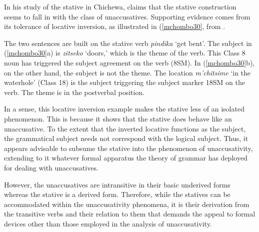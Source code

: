 \documentclass[output=paper]{langscibook}
\begin{document}
In his study of the stative in Chichewa, \citet{Mchombo:1993aa} claims that the stative construction seems to fall in with the class of unaccusatives. Supporting evidence comes from its tolerance of locative inversion, as illustrated in (\ref{mchombo30}, from \citet[18]{Mchombo:1993aa}. 

\begin{exe}
\ex\label{mchombo30}{
\begin{xlist}
\end{xlist}
}
\end{exe}

The two sentences are built on the stative verb \textit{pindika} `get bent'. The subject in (\ref{mchombo30}a) is \textit{zitseko} `doors,' which is the theme of the verb. This Class 8 noun has triggered the subject agreement on the verb (8SM). In (\ref{mchombo30}b), on the other hand, the subject is not the theme. The location \textit{m'chitsime} `in the waterhole'  (Class 18) is the subject triggering the subject marker 18SM on the verb. The theme is in the postverbal position.  
 
In a sense, this locative inversion example makes the stative less of an isolated phenomenon. This is because it shows that the stative does behave like an unaccusative. To the extent that the inverted locative functions as the subject, the grammatical subject needs not correspond with the logical subject. Thus, it appears advisable to subsume the stative into the phenomenon of unaccusativity, extending to it whatever formal apparatus the theory of grammar has deployed for dealing with unaccusatives. 
 
However, the unaccusatives are intransitive in their basic underived forms whereas the stative is a derived form. Therefore, while the statives can be accommodated within the unaccusativity phenomena, it is their derivation from the transitive verbs and their relation to them that demands the appeal to formal devices other than those employed in the analysis of unaccusativity. 
\end{document}
